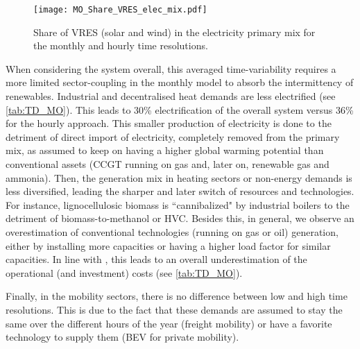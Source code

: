  \begin{figure}[!htbp]
\centering
\texttt{[image: MO\_Share\_VRES\_elec\_mix.pdf]}
\caption{Share of \gls{VRES} (\ie solar and wind) in the electricity primary mix for the monthly and hourly time resolutions.}
\label{fig:MO_Share_VRES_elec_mix}
\end{figure}

When considering the system overall, this averaged time-variability requires a more limited sector-coupling in the monthly model to absorb the intermittency of renewables. Industrial and decentralised heat demands are less electrified (see \autoref{tab:TD_MO}). This leads to 30\% electrification of the overall system versus 36\% for the hourly approach. This smaller production of electricity is done to the detriment of direct import of electricity, completely removed from the primary mix, as assumed to keep on having a higher global warming potential than conventional assets (\eg \gls{CCGT} running on gas and, later on, renewable gas and ammonia). Then, the generation mix in heating sectors or non-energy demands is less diversified, leading the sharper and later switch of resources and technologies. For instance, lignocellulosic biomass is ``cannibalized" by industrial boilers to the detriment of biomass-to-methanol or \gls{HVC}. Besides this, in general, we observe an overestimation of conventional technologies (\eg running on gas or oil) generation, either by installing more capacities or having a higher load factor for similar capacities. In line with \citet{Poncelet2016}, this leads to an overall underestimation of the operational (and investment) costs (see \autoref{tab:TD_MO}).

Finally, in the mobility sectors, there is no difference between low and high time resolutions. This is due to the fact that these demands are assumed to stay the same over the different hours of the year (\ie freight mobility) or have a favorite technology to supply them (\eg \gls{BEV} for private mobility).


